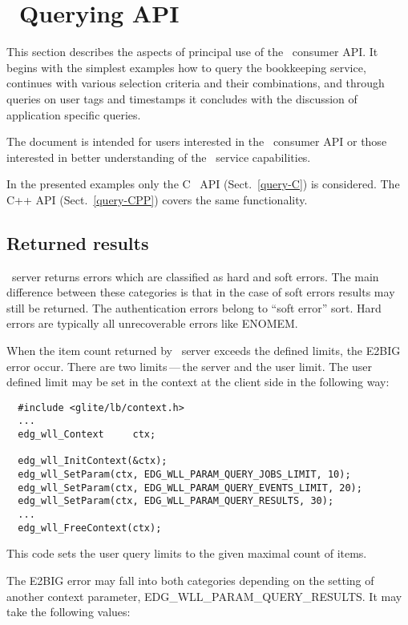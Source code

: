 \section{\LB\ Querying API}

\def\partitle#1{\par{\textbf{#1}}\par}

\label{ConsOview}
This section describes the aspects of principal use of the \LB\ consumer API.
It begins with the simplest examples how to query the bookkeeping
service, continues with various selection criteria and their combinations, and
through queries on user tags and timestamps it concludes with the discussion of
application specific queries.

The document is intended for users interested in the \LB\
consumer API or those interested in better understanding of the \LB\ service 
capabilities.

In the presented examples only the C \LB\ API (Sect.~\ref{query-C}) is considered.
The C++ API (Sect.~\ref{query-CPP})  covers the same functionality.

\subsection{Returned results}

\LB\ server returns errors which are classified as hard and soft errors.
The main difference between these categories is that in the case of soft
errors results may still be returned.
The authentication errors belong to
``soft error'' sort. Hard errors are typically all unrecoverable errors like ENOMEM.

When the item count returned by \LB\ server exceeds the defined limits, the E2BIG error occur.
There are two limits\,---\,the server and the user limit. The user defined limit may be set in
the context at the client side in the following way:
\begin{verbatim}
  #include <glite/lb/context.h>
  ...
  edg_wll_Context     ctx;    

  edg_wll_InitContext(&ctx);
  edg_wll_SetParam(ctx, EDG_WLL_PARAM_QUERY_JOBS_LIMIT, 10);
  edg_wll_SetParam(ctx, EDG_WLL_PARAM_QUERY_EVENTS_LIMIT, 20);
  edg_wll_SetParam(ctx, EDG_WLL_PARAM_QUERY_RESULTS, 30);
  ...
  edg_wll_FreeContext(ctx);
\end{verbatim}
This code sets the user query limits to the given maximal count of items.

The E2BIG error may fall into both categories depending on the setting of
another context parameter, EDG\_WLL\_PARAM\_QUERY\_RESULTS.
It may take the following values:

